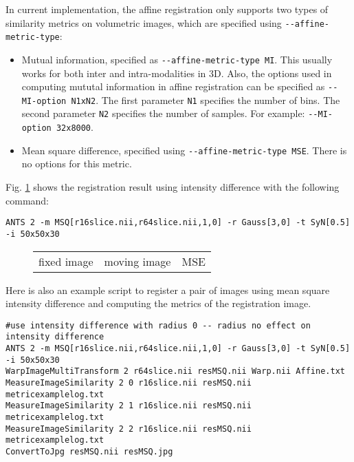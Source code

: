 In current implementation, the affine registration only supports two types of similarity metrics on volumetric images, which are specified using \verb"--affine-metric-type":
\begin{itemize}
    \item Mutual information, specified as \verb"--affine-metric-type MI". This usually works for both inter and intra-modalities in 3D. Also, the options used in computing mututal information in affine registration can be specified as \verb"--MI-option N1xN2". The first parameter \verb"N1" specifies the number of bins. The second parameter \verb"N2" specifies the number of samples. For example: \verb"--MI-option 32x8000".

    \item Mean square difference, specified using \verb"--affine-metric-type MSE". There is no options for this metric.
\end{itemize}

Fig. \ref{fig:metric_example} shows the registration result using intensity difference with the following command:
\begin{verbatim}
ANTS 2 -m MSQ[r16slice.nii,r64slice.nii,1,0] -r Gauss[3,0] -t SyN[0.5] -i 50x50x30
\end{verbatim}

\begin{figure}
    \label{fig:metric_example}
    \centering
    \begin{tabular}[h]{c|c|c}
        fixed image &
        moving image & 
        MSE  \\
    \end{tabular} 
\end{figure}
Here is also an example script to register a pair of images using mean square intensity difference and computing the metrics of the registration image.
\begin{verbatim}
#use intensity difference with radius 0 -- radius no effect on intensity difference
ANTS 2 -m MSQ[r16slice.nii,r64slice.nii,1,0] -r Gauss[3,0] -t SyN[0.5] -i 50x50x30
WarpImageMultiTransform 2 r64slice.nii resMSQ.nii Warp.nii Affine.txt
MeasureImageSimilarity 2 0 r16slice.nii resMSQ.nii metricexamplelog.txt
MeasureImageSimilarity 2 1 r16slice.nii resMSQ.nii metricexamplelog.txt
MeasureImageSimilarity 2 2 r16slice.nii resMSQ.nii metricexamplelog.txt
ConvertToJpg resMSQ.nii resMSQ.jpg
\end{verbatim}
